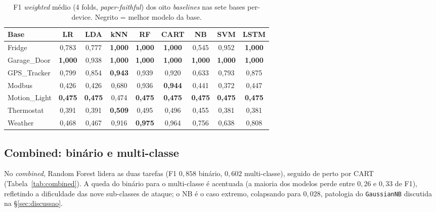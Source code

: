 \begin{table}[ht]
  \centering
  \caption{F1 \emph{weighted} médio (4 folds, \emph{paper-faithful})
           dos oito \emph{baselines} nas sete bases per-device.
           Negrito = melhor modelo da base.}
  \label{tab:perdevice_ours}
  \scriptsize
  \begin{tabular}{lcccccccc}
    \toprule
    \textbf{Base} & \textbf{LR} & \textbf{LDA} & \textbf{kNN} & \textbf{RF} & \textbf{CART} & \textbf{NB} & \textbf{SVM} & \textbf{LSTM} \\
    \midrule
    Fridge       & 0{,}783 & 0{,}777 & \textbf{1{,}000} & \textbf{1{,}000} & \textbf{1{,}000} & 0{,}545 & 0{,}952 & \textbf{1{,}000} \\
    Garage\_Door & \textbf{1{,}000} & 0{,}938 & \textbf{1{,}000} & \textbf{1{,}000} & \textbf{1{,}000} & \textbf{1{,}000} & \textbf{1{,}000} & \textbf{1{,}000} \\
    GPS\_Tracker & 0{,}799 & 0{,}854 & \textbf{0{,}943} & 0{,}939 & 0{,}920 & 0{,}633 & 0{,}793 & 0{,}875 \\
    Modbus       & 0{,}426 & 0{,}426 & 0{,}680 & 0{,}936 & \textbf{0{,}944} & 0{,}441 & 0{,}372 & 0{,}447 \\
    Motion\_Light & \textbf{0{,}475} & \textbf{0{,}475} & 0{,}474 & \textbf{0{,}475} & \textbf{0{,}475} & \textbf{0{,}475} & \textbf{0{,}475} & \textbf{0{,}475} \\
    Thermostat   & 0{,}391 & 0{,}391 & \textbf{0{,}509} & 0{,}495 & 0{,}496 & 0{,}455 & 0{,}381 & 0{,}381 \\
    Weather      & 0{,}468 & 0{,}467 & 0{,}916 & \textbf{0{,}975} & 0{,}964 & 0{,}756 & 0{,}638 & 0{,}808 \\
    \bottomrule
  \end{tabular}
\end{table}

\subsection{Combined: binário e multi-classe}

No \emph{combined}, Random Forest lidera as duas tarefas (F1 $0{,}858$
binário, $0{,}602$ multi-classe), seguido de perto por CART
(Tabela~\ref{tab:combined}). A queda do binário para o
multi-classe é acentuada (a maioria dos modelos perde entre $0{,}26$ e
$0{,}33$ de F1), refletindo a dificuldade das nove sub-classes de
ataque; o NB é o caso extremo, colapsando para $0{,}028$, patologia do
\texttt{GaussianNB} discutida na \S{}\ref{sec:discussao}.


